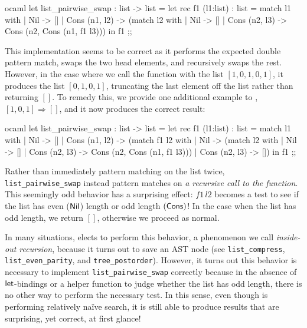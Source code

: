 \begin{center}
  \begin{cminted}{ocaml}
let list_pairwise_swap : list -> list =
  let rec f1 (l1:list) : list =
    match l1 with
      | Nil -> []
      | Cons (n1, l2) ->
          (match l2 with
          | Nil -> []
          | Cons (n2, l3) -> Cons (n2, Cons (n1, f1 l3)))
  in
    f1
;;
  \end{cminted}
\end{center}

This implementation seems to be correct as it performs the expected double pattern match, swaps the two head elements, and recursively swaps the rest.
However, in the case where we call the function with the list $[1, 0, 1, 0, 1]$, it produces the list $[0, 1, 0, 1]$, truncating the last element off the list rather than returning $[]$.
To remedy this, we provide one additional example to \myth{}, $[1, 0, 1] ⇒ []$, and it now produces the correct result:

\begin{center}
  \begin{cminted}{ocaml}
let list_pairwise_swap : list -> list =
  let rec f1 (l1:list) : list =
    match l1 with
      | Nil -> []
      | Cons (n1, l2) ->
          (match f1 l2 with
          | Nil -> (match l2 with
                   | Nil -> []
                   | Cons (n2, l3) -> Cons (n2, Cons (n1, f1 l3)))
          | Cons (n2, l3) -> [])
  in
    f1
;;
  \end{cminted}
\end{center}

Rather than immediately pattern matching on the list twice, \texttt{list\_pairwise\_swap} instead pattern matches on \emph{a recursive call to the function}.
This seemingly odd behavior has a surprising effect: $f1\,l2$ becomes a test to see if the list has even ($\mathsf{Nil}$) length or odd length $(\mathsf{Cons})$!
In the case when the list has odd length, we return $[]$, otherwise we proceed as normal.

In many situations, \myth{} elects to perform this behavior, a phenomenon we call \emph{inside-out recursion}, because it turns out to save an AST node (see \texttt{list\_compress}, \texttt{list\_even\_parity}, and \texttt{tree\_postorder}).
However, it turns out this behavior is necessary to implement \texttt{list\_pairwise\_swap} correctly because in the absence of $\mathsf{let}$-bindings or a helper function to judge whether the list has odd length, there is no other way to perform the necessary test.
In this sense, even though \myth{} is performing relatively na\"{i}ve search, it is still able to produce results that are surprising, yet correct, at first glance!
